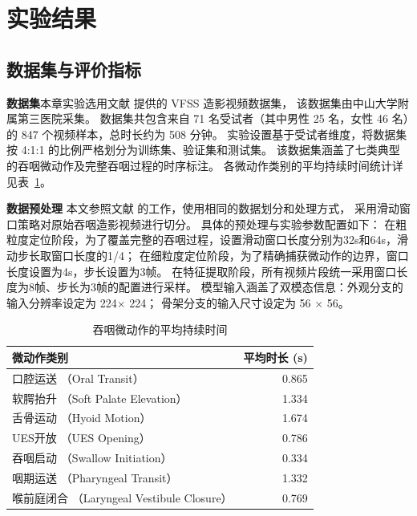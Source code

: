 \section{实验结果}
\subsection{数据集与评价指标}
\textbf{数据集}\quad 本章实验选用文献 \parencite{ruan2023temporal} 提供的 VFSS 造影视频数据集，
该数据集由中山大学附属第三医院采集。
数据集共包含来自 71 名受试者（其中男性 25 名，女性 46 名）的 847 个视频样本，总时长约为 508 分钟。
实验设置基于受试者维度，将数据集按 4:1:1 的比例严格划分为训练集、验证集和测试集。
该数据集涵盖了七类典型的吞咽微动作及完整吞咽过程的时序标注。
各微动作类别的平均持续时间统计详见表~\ref{tab:avg_duration}。

\textbf{数据预处理}\quad 
本文参照文献 \parencite{ruan2023temporal} 的工作，使用相同的数据划分和处理方式，
采用滑动窗口策略对原始吞咽造影视频进行切分。
具体的预处理与实验参数配置如下：
在粗粒度定位阶段，为了覆盖完整的吞咽过程，设置滑动窗口长度分别为32s和64s，滑动步长取窗口长度的1/4；
在细粒度定位阶段，为了精确捕获微动作的边界，窗口长度设置为4s，步长设置为3帧。
在特征提取阶段，所有视频片段统一采用窗口长度为8帧、步长为3帧的配置进行采样。
模型输入涵盖了双模态信息：外观分支的输入分辨率设定为 224$ \times$ 224；
骨架分支的输入尺寸设定为 56 $\times$ 56。

\begin{table}[tb]
    \small
    \renewcommand{\arraystretch}{1.0}
    \renewcommand{\tabcolsep}{15pt}
    \centering
    \caption{吞咽微动作的平均持续时间}
    \begin{tabular}{lr}
        \toprule
        微动作类别 & 平均时长 (s) \\
        \midrule
        口腔运送 （Oral Transit） \cite{dantas2009effect} & 0.865 \\
        软腭抬升 （Soft Palate Elevation） & 1.334 \\
        舌骨运动 （Hyoid Motion）\cite{molfenter2012temporal} & 1.674 \\
        UES开放 （UES Opening） \cite{molfenter2012temporal} & 0.786 \\
        吞咽启动 （Swallow Initiation） & 0.334 \\
        咽期运送 （Pharyngeal Transit） \cite{dantas2009effect} & 1.332 \\
        喉前庭闭合 （Laryngeal Vestibule Closure） \cite{park2010initiation} & 0.769 \\
        \bottomrule
    \end{tabular}
    \label{tab:avg_duration}
\end{table}

